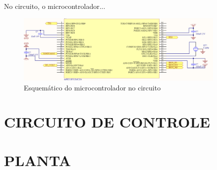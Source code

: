 No circuito, o microcontrolador...

\begin{figure}[!htb]
    \centering
    \includegraphics[width=0.9\textwidth]{./dados/figuras/proj-uc}
    \caption{Esquemático do microcontrolador no circuito}
    \label{fig:figura-dspic}
\end{figure}


\section{CIRCUITO DE CONTROLE}
\label{sec:controlCircuit}



\section{PLANTA}
\label{sec:plant}

